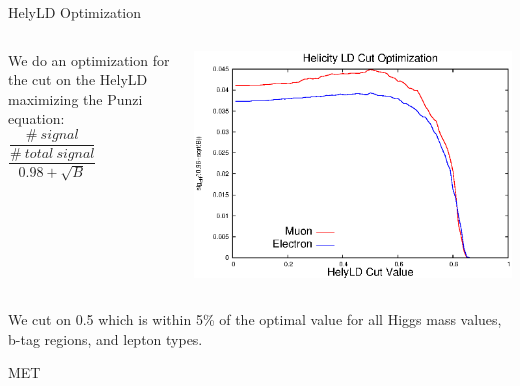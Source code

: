 \begin{frame}{HelyLD Optimization}

  \begin{columns}
    \begin{column}{0.3\textwidth}
        We do an optimization for the cut on the HelyLD maximizing the Punzi equation:\\ 
        \vspace{1em}
        $\dfrac{\dfrac{\#\ signal}{\#\ total\ signal}}{0.98 + \sqrt{B}}$
    \end{column}
    \begin{column}{0.7\textwidth}
      \includegraphics[width=0.99\linewidth]{images/hely_optimization.eps}
    \end{column}
  \end{columns}
\begin{center}
We cut on 0.5 which is within 5\% of the optimal value for all Higgs mass values, b-tag regions, and lepton types.
\end{center}
\end{frame}








\begin{frame}{MET}

\end{frame}

















